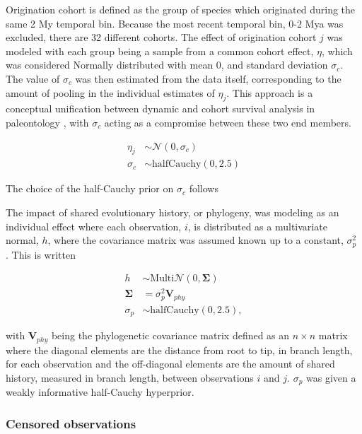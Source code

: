 \documentclass[12pt,letterpaper]{article}
\begin{document}
Origination cohort is defined as the group of species which originated during the same 2 My temporal bin. Because the most recent temporal bin, 0-2 Mya was excluded, there are 32 different cohorts. The effect of origination cohort \(j\) was modeled with each group being a sample from a common cohort effect, \(\eta\), which was considered Normally distributed with mean 0, and standard deviation \(\sigma_{c}\). The value of \(\sigma_{c}\) was then estimated from the data itself, corresponding to the amount of pooling in the individual estimates of \(\eta_{j}\). This approach is a conceptual unification between dynamic and cohort survival analysis in paleontology \citep{Foote1988,Raup1978,Raup1975,VanValen1979,Baumiller1993}, with \(\sigma_{c}\) acting as a compromise between these two end members.

\begin{align*}
  \eta_{j} &\sim \mathcal{N}(0, \sigma_{c}) \\
  \sigma_{c} &\sim \mathrm{halfCauchy}(0, 2.5)
\end{align*}

The choice of the half-Cauchy prior on \(\sigma_{c}\) follows \citet{Gelman2006a}

The impact of shared evolutionary history, or phylogeny, was modeling as an individual effect where each observation, \(i\), is distributed as a multivariate normal, \(h\), where the covariance matrix was assumed known up to a constant, \(\sigma_{p}^{2}\) \citep{Lynch1991,Housworth2004}. This is written

\begin{align*}
  h &\sim \mathrm{Multi}\mathcal{N}(0, \mathbf{\Sigma}) \\
  \mathbf{\Sigma} &= \sigma_{p}^{2} \mathbf{V}_{phy} \\
  \sigma_{p} &\sim \mathrm{halfCauchy}(0, 2.5),
\end{align*}
 
with \(\mathbf{V}_{phy}\) being the phylogenetic covariance matrix defined as an \(n \times n\) matrix where the diagonal elements are the distance from root to tip, in branch length, for each observation and the off-diagonal elements are the amount of shared history, measured in branch length, between observations \(i\) and \(j\). \(\sigma_{p}\) was given a weakly informative half-Cauchy hyperprior. 


\subsubsection{Censored observations} \label{sec:censor}
\end{document}
